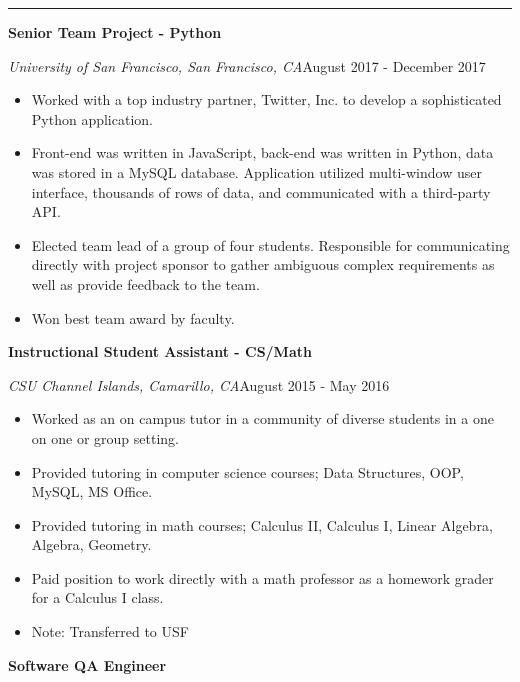 \documentclass{article}
\begin{document}
\noindent{}\rule[-2pt]{\textwidth}{.3pt}
\noindent\large{\textbf{Senior Team Project - Python}}\\
\normalsize{
	\textit{University of San Francisco, San Francisco, CA}\hspace*{200pt}August 2017 - December 2017\\
	\vspace{-4mm}
		\begin{itemize}
  			\item Worked with a top industry partner, Twitter, Inc. to develop a sophisticated Python application.
  			\item Front-end was written in JavaScript, back-end was written in Python, data was stored in a MySQL database. Application utilized multi-window user interface, thousands of rows of data, and communicated with a third-party API.
  			\item Elected team lead of a group of four students. Responsible for communicating directly with project sponsor to gather ambiguous complex requirements as well as provide feedback to the team.
  			\item Won best team award by faculty.
		\end{itemize}
}
\noindent\large{\textbf{Instructional Student Assistant - CS/Math}}\\
\normalsize{
	\textit{CSU Channel Islands, Camarillo, CA}\hspace*{270pt}August 2015 - May 2016\\
	\vspace{-4mm}
		\begin{itemize}
			\item Worked as an on campus tutor in a community of diverse students in a one on one or group setting.
			\item Provided tutoring in computer science courses; Data Structures, OOP, MySQL, MS Office.
			\item Provided tutoring in math courses; Calculus II, Calculus I, Linear Algebra, Algebra, Geometry.
			\item Paid position to work directly with a math professor as a homework grader for a Calculus I class.
			\item Note: Transferred to USF
		\end{itemize}
}
\noindent\large{\textbf{Software QA Engineer}}\\
\end{document}
